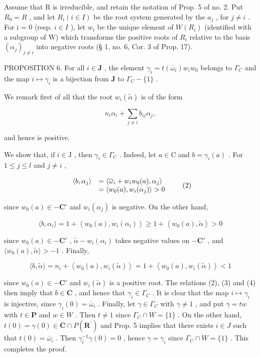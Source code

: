Assume that R is irreducible, and retain the notation of Prop. 5 of no. 2. Put \(R_{0} = R\) , and let \(R_{i} (i \in I)\) be the root system generated by the \(a_{j}\) , for \(j \neq i\) . For i = 0 (resp. \(i \in I\) ), let \(w_{i}\) be the unique element of \(W(R_{i})\) (identified with a subgroup of W) which transforms the positive roots of \(R_{i}\) relative to the basis \((\alpha_{j})_{j \neq i}\) into negative roots (§ 1, no. 6, Cor. 3 of Prop. 17).

PROPOSITION 6. For all \(i \in \mathbf{J}\) , the element \(\gamma_i = t(\overline{\omega}_i)w_i w_0\) belongs to \(\Gamma_{C}\) and the map \(i \mapsto \gamma_i\) is a bijection from \(\mathbf{J}\) to \(\Gamma_{C} - \{1\}\) .

We remark first of all that the root \(w_{i}(\tilde{\alpha})\) is of the form

\[
n _ {i} \alpha_ {i} + \sum_ {j \neq i} b _ {i j} \alpha_ {j},
\]

and hence is positive.

We show that, if \(i \in \mathrm{J}\) , then \(\gamma_i \in \Gamma_{C}\) . Indeed, let \(a \in \mathrm{C}\) and \(b = \gamma_i(a)\) . For \(1 \leqslant j \leqslant l\) and \(j \neq i\) ,

\[
\begin{array}{r l} \langle b, \alpha_ {j} \rangle & = \langle \overline {{\omega}} _ {i} + w _ {i} w _ {0} (a), \alpha_ {j} \rangle \\ & = \langle w _ {0} (a), w _ {i} (\alpha_ {j}) \rangle > 0 \end{array}\tag{2}
\]

since \(w_0(a) \in -\mathbf{C}'\) and \(w_i(\alpha_j)\) is negative. On the other hand,

\[
\langle b, \alpha_ {i} \rangle = 1 + \left\langle w _ {0} (a), w _ {i} (\alpha_ {i}) \right\rangle \geqslant 1 + \left\langle w _ {0} (a), \tilde {\alpha} \right\rangle > 0\tag{3}
\]

since \(w_0(a) \in -\mathbf{C}'\) , \(\tilde{\alpha} - w_i(\alpha_i)\) takes negative values on \(-\mathbf{C}'\) , and \(\langle w_0(a), \tilde{\alpha} \rangle > -1\) . Finally,

\[
\langle b, \tilde {\alpha} \rangle = n _ {i} + \left\langle w _ {0} (a), w _ {i} (\tilde {\alpha}) \right\rangle = 1 + \left\langle w _ {0} (a), w _ {i} (\tilde {\alpha}) \right\rangle <   1\tag{4}
\]

since \(w_0(a) \in -\mathbf{C}'\) and \(w_i(\tilde{\alpha})\) is a positive root. The relations (2), (3) and (4) then imply that \(b \in \mathbf{C}\) , and hence that \(\gamma_i \in \Gamma_{C}\) . It is clear that the map \(i \mapsto \gamma_i\) is injective, since \(\gamma_i(0) = \overline{\omega}_i\) . Finally, let \(\gamma \in \Gamma_{C}\) with \(\gamma \neq 1\) , and put \(\gamma = tw\) with \(t \in \mathbf{P}\) and \(w \in W\) . Then \(t \neq 1\) since \(\Gamma_{C} \cap W = \{1\}\) . On the other hand, \(t(0) = \gamma(0) \in \overline{\mathbf{C}} \cap P(\mathbf{R}^{\prime})\) and Prop. 5 implies that there exists \(i \in J\) such that \(t(0) = \overline{\omega}_i\) . Then \(\gamma_i^{-1}\gamma(0) = 0\) , hence \(\gamma = \gamma_i\) since \(\Gamma_{C} \cap W = \{1\}\) . This completes the proof.

